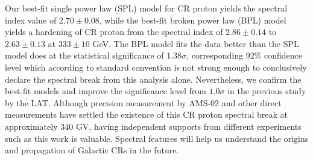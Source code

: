 Our best-fit single power law (SPL) model for CR proton yields
the spectral index value of $2.70\pm 0.08$, while the
best-fit broken power law (BPL) model yields a hardening of
CR proton from the spectral index of $2.86\pm 0.14$ to $2.63\pm 0.13$
at $333\pm 10$ GeV. The BPL model fits the data better than
the SPL model does at the statistical significance of 1.38$\sigma$,
corresponding 92\% confidence level which according to
standard convention is not strong enough to conclusively declare
the spectral break from this analysis alone.
Nevertheless, we confirm the best-fit models and improve
the significance level from $1.0\sigma$ in the previous study by the LAT.
Although precision measurement by AMS-02 and other
direct measurements have settled the existence of
this CR proton spectral break at approximately 340 GV,
having independent supports from different experiments
such as this work is valuable. Spectral features will help us
understand the origins and propagation of Galactic CRs in the future.


